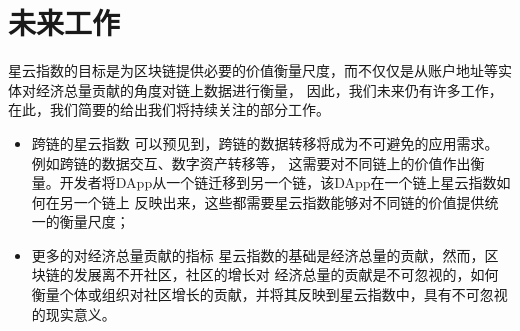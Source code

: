 \section{未来工作}
星云指数的目标是为区块链提供必要的价值衡量尺度，而不仅仅是从账户地址等实体对经济总量贡献的角度对链上数据进行衡量，
因此，我们未来仍有许多工作，在此，我们简要的给出我们将持续关注的部分工作。
\begin{itemize}
\item{跨链的星云指数} 可以预见到，跨链的数据转移将成为不可避免的应用需求。例如跨链的数据交互、数字资产转移等，
这需要对不同链上的价值作出衡量。开发者将DApp从一个链迁移到另一个链，该DApp在一个链上星云指数如何在另一个链上
反映出来，这些都需要星云指数能够对不同链的价值提供统一的衡量尺度；
\item{更多的对经济总量贡献的指标} 星云指数的基础是经济总量的贡献，然而，区块链的发展离不开社区，社区的增长对
经济总量的贡献是不可忽视的，如何衡量个体或组织对社区增长的贡献，并将其反映到星云指数中，具有不可忽视的现实意义。

\end{itemize}
